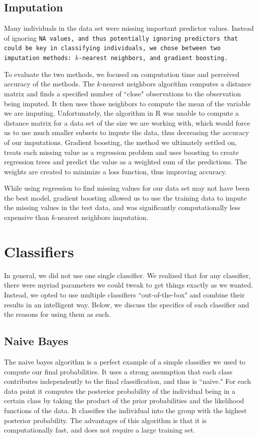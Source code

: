 \documentclass[11pt, oneside]{article}   	%
\begin{document}
 	\subsection{Imputation}
	Many individuals in the data set were missing important predictor values.
	Instead of ignoring \tt NA\rm~values, and thus potentially ignoring predictors that 
	could be key in 
	classifying individuals, we chose between two imputation methods: $k$-nearest 
	neighbors, and gradient boosting. 
	
	To evaluate the two methods, we 
	focused on computation time and perceived accuracy of the methods. The $k$-nearest 
	neighbors algorithm
	computes a distance matrix and finds a specified number of ``close" observations to the 
	observation being imputed. It then uses those neighbors to compute the mean of the variable we are imputing. Unfortunately, the algorithm in R was unable to compute a distance
	matrix for a data set of the size we are working with, which would force us to use much smaller
	subsets to impute the data, thus decreasing the accuracy of our imputations. Gradient
	boosting, the method we ultimately settled on, treats each missing value as a regression
	problem and uses boosting to create regression trees and predict the value as a weighted
	sum of the predictions. The weights are created to minimize a loss function, thus improving
	accuracy. 
	
	While using regression to find missing values for our data set may not have been
	the best model, gradient boosting allowed us to use the training data to impute the missing 
	values in the test data, and was significantly computationally less expensive than $k$-nearest 
	neighbors imputation. 
\section{Classifiers}
In general, we did not use one single classifier. We realized that for any classifier, there were myriad
parameters we could  tweak to get things exactly as we wanted. Instead, we 
opted to use multiple classifiers ``out-of-the-box" and combine their results in an intelligent way. 
Below, we discuss the specifics of each classifier and the reasons for using them as such.
	\subsection{Naive Bayes}
	The naive bayes algorithm is a perfect example of a simple classifier we used to compute our 
	final probabilities. It uses a strong assumption that each class contributes independently to the final classification, and thus is ``naive." For each data point it computes the posterior probability of the individual being in a certain class by taking the product of the prior probabilities and the likelihood functions of the data. It classifies the individual into the group with the highest posterior probability. The advantages of this algorithm is that it is computationally fast, and does not require a large training set. 
\end{document}
